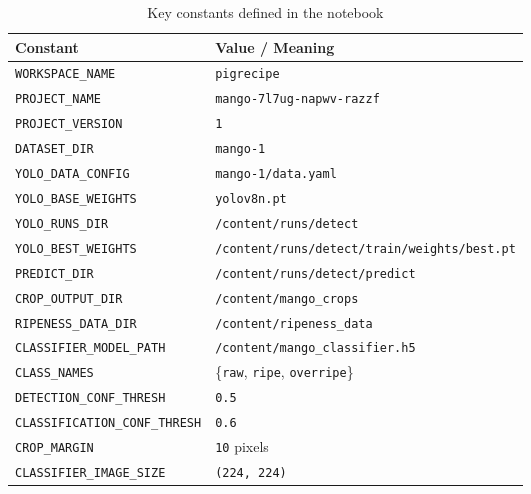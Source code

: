 \documentclass[12pt,a4paper]{article}
\begin{document}
\begin{table}[H]
\centering
\caption{Key constants defined in the notebook}
\label{tab:constants}
\begin{tabularx}{\textwidth}{>{\raggedright\arraybackslash}p{} X}
\toprule
\textbf{Constant} & \textbf{Value / Meaning} \\
\midrule
\texttt{WORKSPACE\_NAME} & \texttt{pigrecipe} \\
\texttt{PROJECT\_NAME} & \texttt{mango-7l7ug-napwv-razzf} \\
\texttt{PROJECT\_VERSION} & \texttt{1} \\
\texttt{DATASET\_DIR} & \texttt{mango-1} \\
\texttt{YOLO\_DATA\_CONFIG} & \texttt{mango-1/data.yaml} \\
\texttt{YOLO\_BASE\_WEIGHTS} & \texttt{yolov8n.pt} \\
\texttt{YOLO\_RUNS\_DIR} & \texttt{/content/runs/detect} \\
\texttt{YOLO\_BEST\_WEIGHTS} & \texttt{/content/runs/detect/train/weights/best.pt} \\
\texttt{PREDICT\_DIR} & \texttt{/content/runs/detect/predict} \\
\texttt{CROP\_OUTPUT\_DIR} & \texttt{/content/mango\_crops} \\
\texttt{RIPENESS\_DATA\_DIR} & \texttt{/content/ripeness\_data} \\
\texttt{CLASSIFIER\_MODEL\_PATH} & \texttt{/content/mango\_classifier.h5} \\
\texttt{CLASS\_NAMES} & \{\texttt{raw}, \texttt{ripe}, \texttt{overripe}\} \\
\texttt{DETECTION\_CONF\_THRESH} & \texttt{0.5} \\
\texttt{CLASSIFICATION\_CONF\_THRESH} & \texttt{0.6} \\
\texttt{CROP\_MARGIN} & \texttt{10} pixels \\
\texttt{CLASSIFIER\_IMAGE\_SIZE} & \texttt{(224, 224)} \\
\bottomrule
\end{tabularx}
\end{table}
\end{document}
